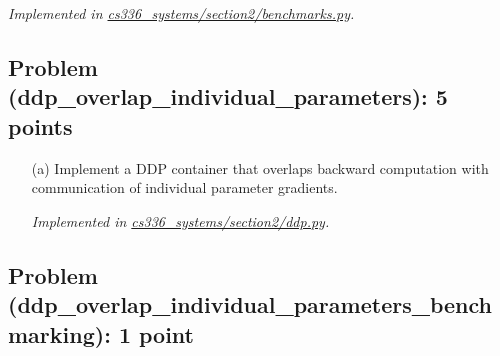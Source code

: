 \documentclass[letterpaper]{article}
\newcommand{\repofile}[2]{\href{https://github.com/echung32/ece405-assignment4-hpc/blob/main/#1}{#2}}
\begin{document}
	\textit{Implemented in \repofile{cs336_systems/section2/benchmarks.py}{cs336\_systems/section2/benchmarks.py}.}
	
	\subsection{Problem (ddp\_overlap\_individual\_parameters): 5 points}
	
	\begin{itemize}
		\item[(a)] Implement a DDP container that overlaps backward computation with communication of individual parameter gradients.
		
		\textit{Implemented in \repofile{cs336_systems/section2/ddp.py}{cs336\_systems/section2/ddp.py}.}
	\end{itemize}
	
	\subsection{Problem (ddp\_overlap\_individual\_parameters\_benchmarking): 1 point}
	
\end{document}
